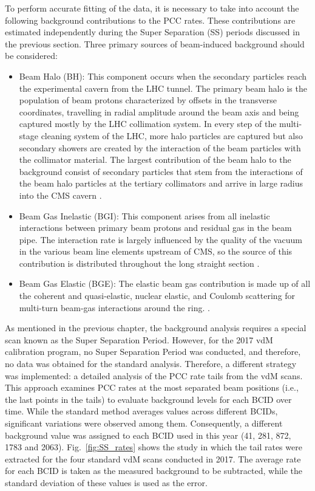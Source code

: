 To perform accurate fitting of the data, it is necessary to take into account the following background contributions to the PCC rates. These contributions are estimated independently during the Super Separation (SS) periods discussed in the previous section. Three primary sources of beam-induced background should be considered:

\begin{itemize}

\item Beam Halo (BH): This component occurs when the secondary particles reach the experimental cavern from the LHC tunnel. The primary beam halo is  the population of beam protons characterized by offsets in the transverse coordinates, travelling in  radial amplitude around the beam axis and being captured mostly by the LHC collimation system. In every step of the multi-stage cleaning system of the LHC, more halo particles are captured but also secondary showers are created by the interaction of the beam particles with the collimator material. The largest contribution of the  beam halo to the background consist of secondary particles  that stem from the interactions of the beam halo particles at the tertiary collimators and arrive in large radius into the CMS cavern \cite{beam_halo}.

\item  Beam Gas Inelastic (BGI): This component arises from all inelastic interactions between primary beam protons and residual gas in the beam pipe. The interaction rate is largely influenced by the quality of the vacuum in the various beam line elements upstream of CMS, so the source of this contribution is distributed throughout the long straight section \cite{bkg_source}.

\item Beam Gas Elastic (BGE): The elastic beam gas contribution is made up of all the coherent and quasi-elastic, nuclear elastic, and Coulomb scattering for multi-turn beam-gas interactions around the ring.  \cite{bkg_source}.

\end{itemize}


As mentioned in the previous chapter, the background analysis requires a special scan known as the Super Separation Period. However, for the 2017 vdM calibration program, no Super Separation Period was conducted, and therefore, no data was obtained for the standard analysis. Therefore, a different strategy was implemented: a detailed analysis of the PCC rate tails from the vdM scans. This approach examines PCC rates at the most separated beam positions (i.e., the last points in the tails) to evaluate background levels for each BCID over time. While the standard method averages values across different BCIDs, significant variations were observed among them. Consequently, a different background value was assigned to each BCID used in this year (41, 281, 872, 1783 and 2063). Fig.~\ref{fig:SS_rates} shows the study in which the tail rates were extracted for the four standard vdM scans conducted in 2017. The average rate for each BCID is taken as the measured background to be subtracted, while the standard deviation of these values is used as the error.


